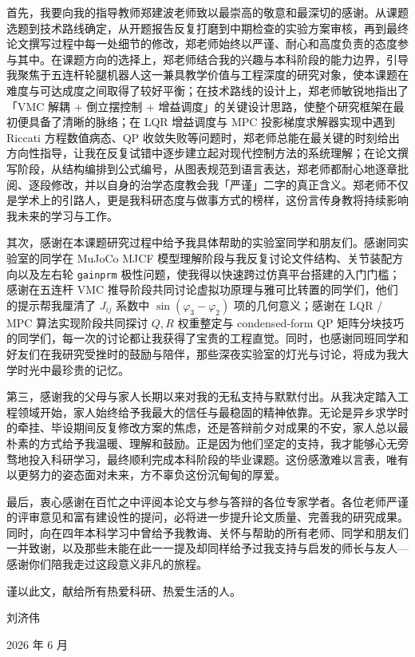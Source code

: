 \documentclass{smbuthesis}
\begin{document}
首先，我要向我的指导教师郑建波老师致以最崇高的敬意和最深切的感谢。从课题选题到技术路线确定，从开题报告反复打磨到中期检查的实验方案审核，再到最终论文撰写过程中每一处细节的修改，郑老师始终以严谨、耐心和高度负责的态度参与其中。在课题方向的选择上，郑老师结合我的兴趣与本科阶段的能力边界，引导我聚焦于五连杆轮腿机器人这一兼具教学价值与工程深度的研究对象，使本课题在难度与可达成度之间取得了较好平衡；在技术路线的设计上，郑老师敏锐地指出了「VMC 解耦 + 倒立摆控制 + 增益调度」的关键设计思路，使整个研究框架在最初便具备了清晰的脉络；在 LQR 增益调度与 MPC 投影梯度求解器实现中遇到 Riccati 方程数值病态、QP 收敛失败等问题时，郑老师总能在最关键的时刻给出方向性指导，让我在反复试错中逐步建立起对现代控制方法的系统理解；在论文撰写阶段，从结构编排到公式编号，从图表规范到语言表达，郑老师都耐心地逐章批阅、逐段修改，并以自身的治学态度教会我「严谨」二字的真正含义。郑老师不仅是学术上的引路人，更是我科研态度与做事方式的榜样，这份言传身教将持续影响我未来的学习与工作。

其次，感谢在本课题研究过程中给予我具体帮助的实验室同学和朋友们。感谢同实验室的同学在 MuJoCo MJCF 模型理解阶段与我反复讨论文件结构、关节装配方向以及左右轮 \texttt{gainprm} 极性问题，使我得以快速跨过仿真平台搭建的入门门槛；感谢在五连杆 VMC 推导阶段共同讨论虚拟功原理与雅可比转置的同学们，他们的提示帮我厘清了 $J_{ij}$ 系数中 $\sin(\varphi_3 - \varphi_2)$ 项的几何意义；感谢在 LQR / MPC 算法实现阶段共同探讨 $Q, R$ 权重整定与 condensed-form QP 矩阵分块技巧的同学们，每一次的讨论都让我获得了宝贵的工程直觉。同时，也感谢同班同学和好友们在我研究受挫时的鼓励与陪伴，那些深夜实验室的灯光与讨论，将成为我大学时光中最珍贵的记忆。

第三，感谢我的父母与家人长期以来对我的无私支持与默默付出。从我决定踏入工程领域开始，家人始终给予我最大的信任与最稳固的精神依靠。无论是异乡求学时的牵挂、毕设期间反复修改方案的焦虑，还是答辩前夕对成果的不安，家人总以最朴素的方式给予我温暖、理解和鼓励。正是因为他们坚定的支持，我才能够心无旁骛地投入科研学习，最终顺利完成本科阶段的毕业课题。这份感激难以言表，唯有以更努力的姿态面对未来，方不辜负这份沉甸甸的厚爱。

最后，衷心感谢在百忙之中评阅本论文与参与答辩的各位专家学者。各位老师严谨的评审意见和富有建设性的提问，必将进一步提升论文质量、完善我的研究成果。同时，向在四年本科学习中曾给予我教诲、关怀与帮助的所有老师、同学和朋友们一并致谢，以及那些未能在此一一提及却同样给予过我支持与启发的师长与友人---感谢你们陪我走过这段意义非凡的旅程。

谨以此文，献给所有热爱科研、热爱生活的人。

\vspace{1em}
\hfill 刘济伟

\hfill 2026 年 6 月



\end{document}
